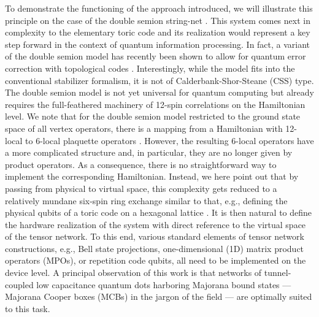 \documentclass[twocolumn,floats,prx,showpacs]{revtex4-1}
\newcommand{\rein}[1]{{\color{rein} #1}}
\begin{document}
To demonstrate the functioning of the approach introduced, we will illustrate this principle on the case of the double semion string-net \cite{Levin2005}. This system comes next in complexity to the elementary toric code \rein{and its realization would represent a key step forward in the context of quantum information processing. In fact, a variant of the double semion model has recently been shown to allow for quantum error correction with topological codes \cite{SemionErrorCorrection}.
Interestingly, while the model fits into the conventional stabilizer formalism, it is not of Calderbank-Shor-Steane (CSS) type.} 
The double semion model is not yet universal for quantum computing but already requires the full-feathered machinery of 12-spin correlations on the Hamiltonian level. \rein{We note that for the double semion model restricted to the ground state space of all vertex operators, there is a mapping from a Hamiltonian with 12-local to 6-local plaquette operators \cite{SemionErrorCorrection}. However, the resulting 6-local operators have a more complicated structure and, in particular, they are no longer given by product operators. As a consequence, there is no straightforward way to implement the corresponding Hamiltonian. Instead, we here point out that} by passing from physical to virtual space, this complexity gets reduced to a relatively mundane six-spin ring exchange similar to that, e.g., defining the physical qubits of a toric code on a hexagonal lattice \cite{Vijay2015}.  It is then natural to define the hardware realization of the system with direct reference to the virtual space of the tensor network. To this end, various standard elements of tensor network constructions, e.g.,  Bell state projections, one-dimensional (1D) matrix product operators (MPOs), or repetition code qubits, all need to be implemented on the device level. A principal observation of this work is that networks of tunnel-coupled low capacitance quantum dots harboring Majorana bound states  --- Majorana Cooper boxes (MCBs) in the jargon of the field \cite{Beri2012,Beri2013,Altland2013,Plugge2017,Karzig2017} --- are optimally suited to this task. 
\end{document}
